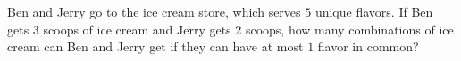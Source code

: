 Ben and Jerry go to the ice cream store, which serves $5$ unique flavors. If Ben gets $3$ scoops of ice cream and Jerry gets $2$ scoops, how many combinations of ice cream can Ben and Jerry get if they can have at most $1$ flavor in common?
